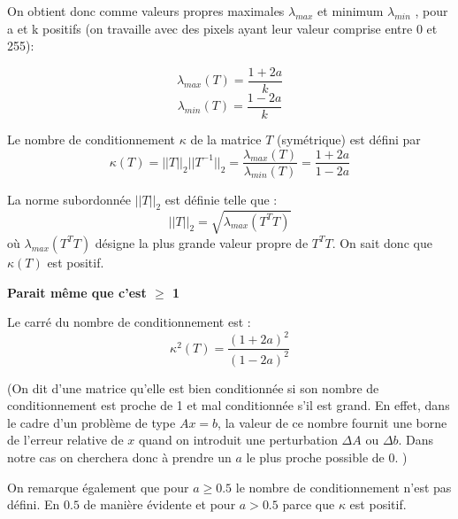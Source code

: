 On obtient donc comme valeurs propres maximales $\lambda_{max}$ et minimum $\lambda_{min}$ , pour a et k positifs (on travaille avec des pixels ayant leur valeur comprise entre 0 et 255): 

	$$\lambda_{max} (T) =  \frac{1+2a}{k} $$
	$$\lambda_{min} (T) =  \frac{1-2a}{k} $$
	
Le nombre de conditionnement $\kappa$ de la matrice $T$ (symétrique) est défini par 
\begin{equation}
	\kappa (T) = ||T||_2||T^{-1}||_2 = \frac{\lambda_{max} (T)}{\lambda_{min} (T)} = \frac{1+2a}{1-2a}
\end{equation}

La norme subordonnée $||T||_2$ est définie telle que : 
$$||T||_2 = \sqrt{\lambda_{max}(T^TT)}$$
où $\lambda_{max}(T^TT)$ désigne la plus grande valeur propre de $T^TT$.
On sait donc que $\kappa(T) $ est positif.	

\textbf{Parait même que c'est $\geq$ 1}

Le carré du nombre de conditionnement est :
\begin{equation}
	\kappa^2 (T) = \frac{(1+2a)^2}{(1-2a)^2}
\end{equation}


(On dit d'une matrice qu'elle est bien conditionnée si son nombre de conditionnement est proche de 1 et mal conditionnée s'il est grand. En effet, dans le cadre d'un problème de type $Ax = b$, la valeur de ce nombre fournit une borne de l'erreur relative de $x$ quand on introduit une perturbation $\Delta A $ ou $\Delta b$. Dans notre cas on cherchera donc à prendre un $a$ le plus proche possible de 0. )

On remarque également que pour $a \geq 0.5$ le nombre de conditionnement n'est pas défini. En $0.5$ de manière évidente et pour $a > 0.5$ parce que $\kappa$ est positif. 
	


